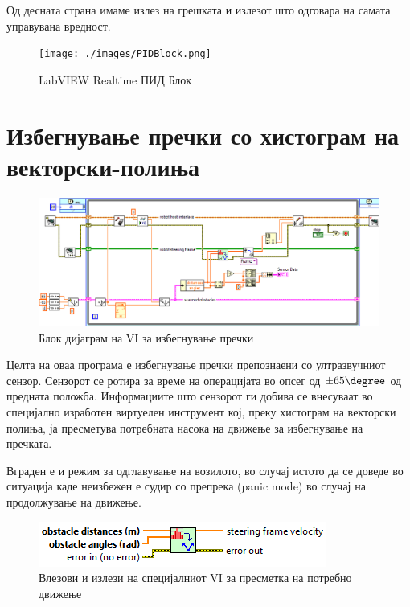 \documentclass[11pt]{article}
\begin{document}
  Од десната страна имаме излез на грешката и излезот што одговара на самата управувана вредност.

  \begin{figure}[H]
    \texttt{[image: ./images/PIDBlock.png]}
    \centering
    \caption{LabVIEW Realtime ПИД Блок}
    \label{fig:PIDBlock.png}
    \end{figure}

\newpage

\section{Избегнување пречки со хистограм на векторски-полиња}
  \label{sec:vfh}
  \begin{figure}[H]
    \centering
    \includegraphics[width=\linewidth]{./images/dani_roaming.png}
    \caption{Блок дијаграм на VI за избегнување пречки}
    \label{fig:dani_roaming.png}
    \end{figure}

    Целта на оваа програма е избегнување пречки препознаени со ултразвучниот сензор. Сензорот се ротира за време на операцијата во опсег од $ \pm 65 \degree $ од предната положба. Информациите што сензорот ги добива се внесуваат во специјално изработен виртуелен инструмент кој, преку хистограм на векторски полиња, ја пресметува потребната насока на движење за избегнување на пречката.

    Вграден е и режим за одглавување на возилото, во случај истото да се доведе во ситуација каде неизбежен е судир со препрека (panic mode) во случај на продолжување на движење.

    \begin{figure}[H]
      \centering
      \includegraphics[width=0.5\linewidth]{./images/dani_roaming_calc_vi.png}
      \caption{Влезови и излези на специјалниот VI за пресметка на потребно движење}
      \label{fig:dani_roaming_calc_vi.png}
      \end{figure}
\end{document}
